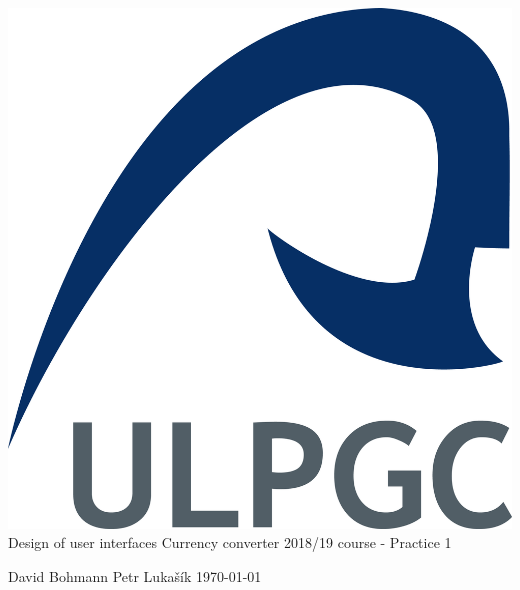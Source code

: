 \documentclass[12pt]{report}
\begin{document}
%
%
\begin{center}
\includegraphics[scale=0.2]{img/ulpgc_logo.jpg}
\vspace{5cm}\linebreak
\Huge{Design of user interfaces}\linebreak
\large{Currency converter}\linebreak
\normalsize{2018/19 course - Practice 1}\linebreak
\vspace{3cm}\linebreak

\small{David Bohmann}\linebreak
\small{Petr Lukašík}\linebreak
\today\linebreak
\end{center}
%
%

%
%

%
%
\end{document}
